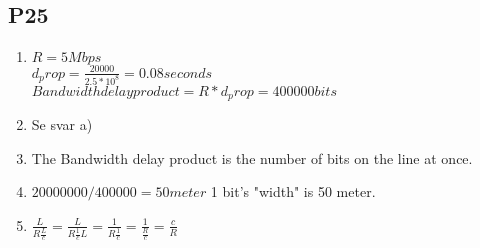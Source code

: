 \subsection{P25}
\begin{enumerate}[label=\alph*)]
    \item $R = 5 Mbps$\\
    $d_prop = \frac{20000}{2.5*10^8} = 0.08 seconds$\\
    $Bandwidth delay product = R * d_prop = 400000 bits$
    \item Se svar a)
    \item The Bandwidth delay product is the number of bits on the line at once.
    \item $20000000 / 400000 = 50 meter$ 1 bit's "width" is 50 meter.
    \item $\frac{L}{R\frac{L}{c}} = \frac{L}{R\frac{1}{c}L}=\frac{1}{R\frac{1}{c}}=\frac{1}{\frac{R}{c}}=\frac{c}{R}$
\end{enumerate}





